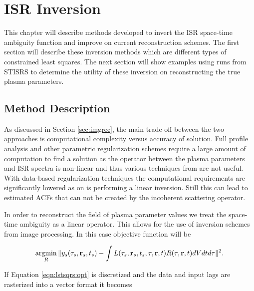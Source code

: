 \chapter{ISR Inversion}
\label{chapter:inversion}
\thispagestyle{myheadings}

\graphicspath{{5_Inversions/Figures/}}

This chapter will describe methods developed to invert the ISR space-time ambiguity function and improve on current reconstruction schemes. The first section will describe these inversion methods which are different types of constrained least squares. The next section will show examples using runs from STISRS to determine the utility of these inversion on reconstructing the true plasma parameters.

\section{Method Description}
As discussed in Section \ref{sec:imgrec}, the main trade-off between the two approaches is computational complexity versus accuracy of solution. Full profile analysis and other parametric regularization schemes require a large amount of computation to find a solution as the operator between the plasma parameters and ISR spectra is non-linear and thus various techniques from are not useful. With data-based regularization techniques the computational requirements are significantly lowered as on is performing a linear inversion. Still this can lead to estimated ACFs that can not be created by the incoherent scattering operator.

In order to reconstruct the field of plasma parameter values we treat the space-time ambiguity as a linear operator. This allows for the use of inversion schemes from image processing. In this case objective function will be 

\begin{equation}
\label{eqn:lstsqrs:opt}
\operatorname*{\arg\!\min}\limits_{R} \| y_s(\tau_s,\mathbf{r}_s,t_s)- \int L(\tau_s,\mathbf{r}_s,t_s,\tau,\mathbf{r},t)R(\tau,\mathbf{r},t)dVdtd\tau \|^2.
\end{equation}

\noindent If Equation \ref{eqn:lstsqrs:opt} is discretized and the data and input lags are rasterized into a vector format it becomes 

